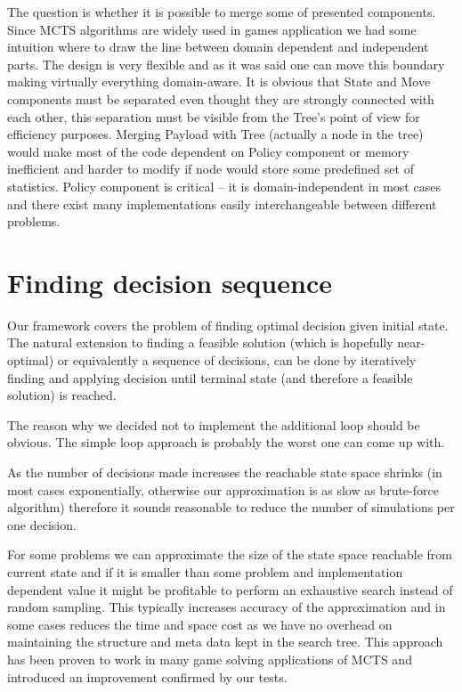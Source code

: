 The question is whether it is possible to merge some of presented components.
Since MCTS algorithms are widely used in games application we had some
intuition where to draw the line between domain dependent and independent
parts. The design is very flexible and as it was said one can move this
boundary making virtually everything domain-aware. It is obvious that State
and Move components must be separated even thought they are strongly connected
with each other, this separation must be visible from the Tree's point of view
for efficiency purposes.
Merging Payload with Tree (actually a node in the tree) would make most of the
code dependent on Policy component or memory inefficient and harder to modify
if node would store some predefined set of statistics.
Policy component is critical -- it is domain-independent in most cases and
there exist many implementations easily interchangeable between different
problems.

\section{Finding decision sequence}
Our framework covers the problem of finding optimal decision given initial
state. The natural extension to finding a feasible solution (which is hopefully
near-optimal) or equivalently a sequence of decisions, can be done by
iteratively finding and applying decision until terminal state (and therefore a
feasible solution) is reached.

The reason why we decided not to implement the additional loop should be
obvious. The simple loop approach is probably the worst one can come up with.

As the number of decisions made increases the reachable state space shrinks (in
most cases exponentially, otherwise our approximation is as slow as brute-force
algorithm) therefore it sounds reasonable to reduce the number of simulations
per one decision.

For some problems we can approximate the size of the state space reachable from
current state and if it is smaller than some problem and implementation
dependent value it might be profitable to perform an exhaustive search instead
of random sampling. This typically increases accuracy of the approximation and
in some cases reduces the time and space cost as we have no overhead on maintaining
the structure and meta data kept in the search tree. This approach has been proven
to work in many game solving applications of MCTS and introduced an improvement
confirmed by our tests.

